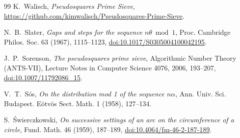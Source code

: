 \documentclass[11pt]{amsart}
\theoremstyle{definition}
\begin{document}
\begin{thebibliography}{99}
K.~Walisch,
\emph{Pseudosquares Prime Sieve},
\url{https://github.com/kimwalisch/Pseudosquares-Prime-Sieve}.

N.~B.~Slater,
\emph{Gaps and steps for the sequence $n\theta \bmod 1$},
Proc. Cambridge Philos. Soc. 63 (1967), 1115--1123,
\href{https://doi.org/10.1017/S0305004100042195}{doi:10.1017/S0305004100042195}.

J.~P.~Sorenson,
\emph{The pseudosquares prime sieve},
Algorithmic Number Theory (ANTS-VII), Lecture Notes in Computer Science 4076, 2006, 193--207,
\href{https://doi.org/10.1007/11792086_15}{doi:10.1007/11792086\_15}.

V.~T.~S\'os,
\emph{On the distribution mod 1 of the sequence $n\alpha$},
Ann. Univ. Sci. Budapest. E\"otv\"os Sect. Math. 1 (1958), 127--134.

S.~\'Swierczkowski,
\emph{On successive settings of an arc on the circumference of a circle},
Fund. Math. 46 (1959), 187--189,
\href{https://doi.org/10.4064/fm-46-2-187-189}{doi:10.4064/fm-46-2-187-189}.

\end{thebibliography}
\end{document}
